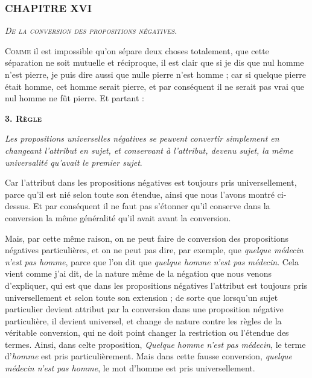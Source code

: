 \subsubsection{\centering \Large CHAPITRE XVI}
\begin{center}\emph{\large\scshape De la conversion des propositions négatives.}\end{center}

	\lettrine{C}{omme} il est impossible qu'on sépare deux choses totalement, que cette séparation ne soit mutuelle et réciproque, il est clair que si je dis que nul homme n'est pierre, je puis dire aussi que nulle pierre n'est homme ; car si quelque pierre était homme, cet homme serait pierre, et par conséquent il ne serait pas vrai que nul homme ne fût pierre. Et partant :

\bigbreak
\begin{center}{\bfseries\scshape\large 3. Règle}\end{center}

	\emph{Les propositions universelles négatives se peuvent convertir simplement en changeant l'attribut en sujet, et conservant à l'attribut, devenu sujet, la même universalité qu'avait le premier sujet}.

Car l'attribut dans les propositions négatives est toujours pris universellement, parce qu'il est nié selon toute son étendue, ainsi que nous l'avons montré ci-dessus. Et par conséquent il ne faut pas s'étonner qu'il conserve dans la conversion la même généralité qu'il avait avant la conversion.

Mais, par cette même raison, on ne peut faire de conversion des propositions négatives particulières, et on ne peut pas dire, par exemple, que \emph{quelque médecin n'est pas homme}, parce que l'on dit que \emph{quelque homme n'est pas médecin}. Cela vient comme j'ai dit, de la nature même de la négation que nous venons d'expliquer, qui est que dans les propositions négatives l'attribut est toujours pris universellement et selon toute son extension ; de sorte que lorsqu'un sujet particulier devient attribut par la conversion dans une proposition négative particulière, il devient universel, et change de nature contre les règles de la véritable conversion, qui ne doit point changer la restriction ou l'étendue des termes. Ainsi, dans celte proposition, \emph{Quelque homme n'est pas médecin}, le terme d'\emph{homme} est pris particulièrement. Mais dans cette fausse conversion, \emph{quelque médecin n'est pas homme}, le mot d'homme est pris universellement.

